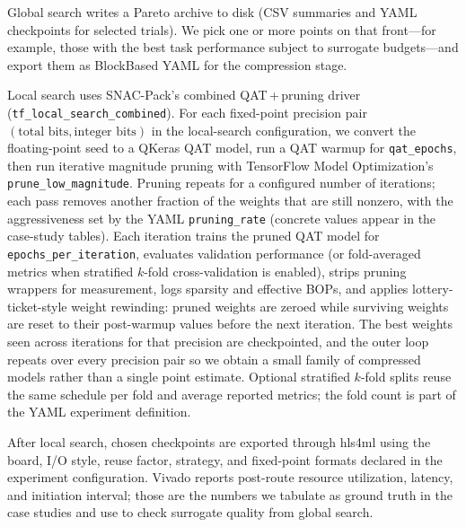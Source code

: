 \documentclass[11pt]{article}
\begin{document}
Global search writes a Pareto archive to disk (CSV summaries and YAML checkpoints for selected trials).
We pick one or more points on that front---for example, those with the best task performance subject to surrogate budgets---and export them as BlockBased YAML for the compression stage.

Local search uses SNAC-Pack's combined QAT\,+\,pruning driver (\texttt{tf\_local\_search\_combined}).
For each fixed-point precision pair $(\text{total bits}, \text{integer bits})$ in the local-search configuration, we convert the floating-point seed to a QKeras QAT model, run a QAT warmup for \texttt{qat\_epochs}, then run iterative magnitude pruning with TensorFlow Model Optimization's \texttt{prune\_low\_magnitude}.
Pruning repeats for a configured number of iterations; each pass removes another fraction of the weights that are still nonzero, with the aggressiveness set by the YAML \texttt{pruning\_rate} (concrete values appear in the case-study tables).
Each iteration trains the pruned QAT model for \texttt{epochs\_per\_iteration}, evaluates validation performance (or fold-averaged metrics when stratified $k$-fold cross-validation is enabled), strips pruning wrappers for measurement, logs sparsity and effective BOPs, and applies lottery-ticket-style weight rewinding: pruned weights are zeroed while surviving weights are reset to their post-warmup values before the next iteration.
The best weights seen across iterations for that precision are checkpointed, and the outer loop repeats over every precision pair so we obtain a small family of compressed models rather than a single point estimate.
Optional stratified $k$-fold splits reuse the same schedule per fold and average reported metrics; the fold count is part of the YAML experiment definition.

After local search, chosen checkpoints are exported through hls4ml using the board, I/O style, reuse factor, strategy, and fixed-point formats declared in the experiment configuration.
Vivado reports post-route resource utilization, latency, and initiation interval; those are the numbers we tabulate as ground truth in the case studies and use to check surrogate quality from global search.
\end{document}
